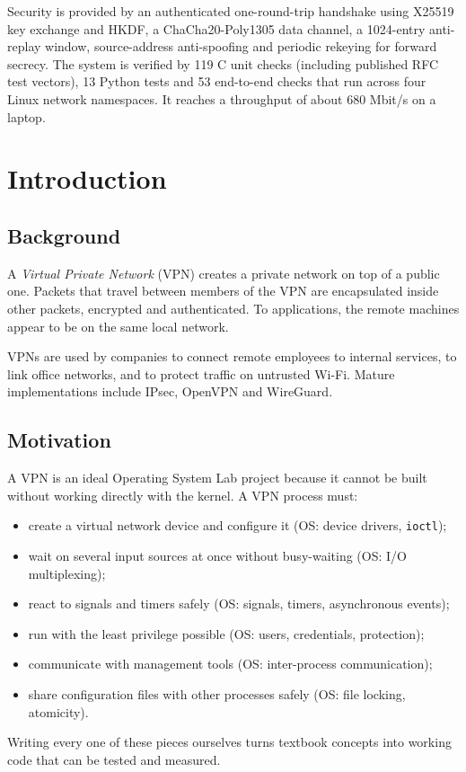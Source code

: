 \documentclass[12pt,a4paper]{report}
\begin{document}
Security is provided by an authenticated one-round-trip handshake using X25519 key
exchange and HKDF, a ChaCha20-Poly1305 data channel, a 1024-entry anti-replay window,
source-address anti-spoofing and periodic rekeying for forward secrecy. The system is
verified by 119 C unit checks (including published RFC test vectors), 13 Python tests
and 53 end-to-end checks that run across four Linux network namespaces. It reaches a
throughput of about 680 Mbit/s on a laptop.

\tableofcontents
\listoffigures
\listoftables

\clearpage
{}


\chapter{Introduction}

\section{Background}
A \emph{Virtual Private Network} (VPN) creates a private network on top of a public
one. Packets that travel between members of the VPN are encapsulated inside other
packets, encrypted and authenticated. To applications, the remote machines appear to
be on the same local network.

VPNs are used by companies to connect remote employees to internal services, to link
office networks, and to protect traffic on untrusted Wi-Fi. Mature implementations
include IPsec, OpenVPN and WireGuard.

\section{Motivation}
A VPN is an ideal Operating System Lab project because it cannot be built without
working directly with the kernel. A VPN process must:
\begin{itemize}
  \item create a virtual network device and configure it (OS: device drivers, \texttt{ioctl});
  \item wait on several input sources at once without busy-waiting (OS: I/O multiplexing);
  \item react to signals and timers safely (OS: signals, timers, asynchronous events);
  \item run with the least privilege possible (OS: users, credentials, protection);
  \item communicate with management tools (OS: inter-process communication);
  \item share configuration files with other processes safely (OS: file locking, atomicity).
\end{itemize}
Writing every one of these pieces ourselves turns textbook concepts into working code
that can be tested and measured.
\end{document}
